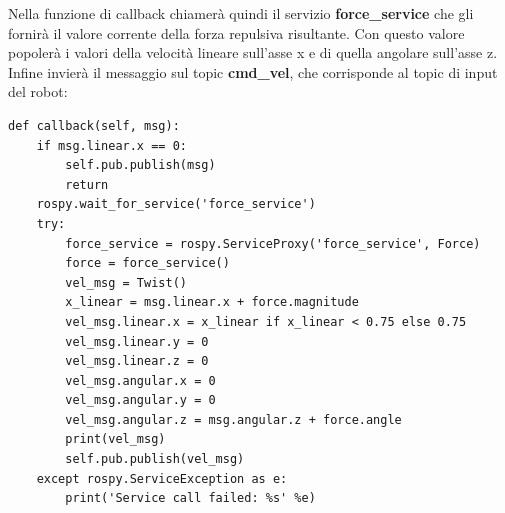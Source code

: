\documentclass[Lau, binding=0.6cm, oneside]{sapthesis}
\begin{document}
Nella funzione di callback chiamerà quindi il servizio \textbf{force\_service} che gli fornirà il valore corrente della forza repulsiva risultante.
Con questo valore popolerà i valori della velocità lineare sull'asse x e di quella angolare sull'asse z.
Infine invierà il messaggio sul topic \textbf{cmd\_vel}, che corrisponde al topic di input del robot:

\begin{lstlisting}
def callback(self, msg):
    if msg.linear.x == 0:
        self.pub.publish(msg)
        return
    rospy.wait_for_service('force_service')
    try:
        force_service = rospy.ServiceProxy('force_service', Force)
        force = force_service()
        vel_msg = Twist()
        x_linear = msg.linear.x + force.magnitude
        vel_msg.linear.x = x_linear if x_linear < 0.75 else 0.75
        vel_msg.linear.y = 0
        vel_msg.linear.z = 0
        vel_msg.angular.x = 0
        vel_msg.angular.y = 0
        vel_msg.angular.z = msg.angular.z + force.angle
        print(vel_msg)
        self.pub.publish(vel_msg)
    except rospy.ServiceException as e:
        print('Service call failed: %s' %e)
\end{lstlisting}



\end{document}
